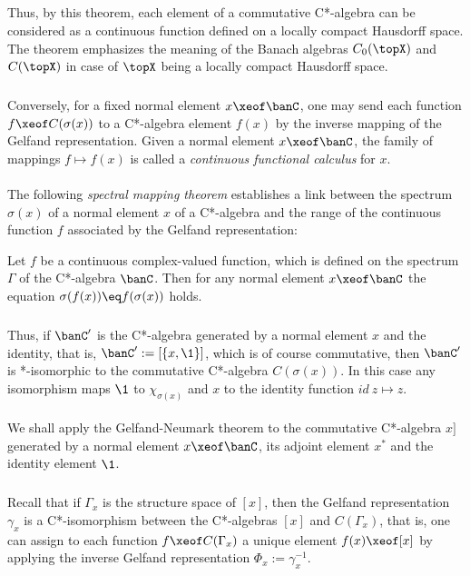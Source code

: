 \documentclass[11pt,twoside]{article}
\begin{document}
\subparagraph{}
Thus, 
by this theorem,
each element of a commutative C*-algebra can be considered
as a continuous function defined on a locally compact Hausdorff space.
The theorem emphasizes the meaning of the Banach algebras $C_0(\topX)$
and $C(\topX)$ in case of $\topX$ being a locally compact Hausdorff space.

\subparagraph{}
Conversely,
for a fixed normal element $x \xeof \banC$,
one may send each function $f \xeof C(\sigma(x))$ to a C*-algebra element $f(x)$
by the inverse mapping of the Gelfand representation.
Given a normal element $x \xeof \banC$,
the family of mappings $f \mapsto f(x)$
is called a \textit{continuous functional calculus} for $x$.

\paragraph{} %
The following \textit{spectral mapping theorem} establishes a link
between the spectrum $\sigma(x)$ of a normal element $x$ of a C*-algebra
and the range of the continuous function $f$
associated by the Gelfand representation:

\begin{theorem1}
Let $f$ be a continuous complex-valued function,
which is defined on the spectrum $\Gamma$ of the C*-algebra $\banC$.
Then for any normal element $x \xeof \banC$
the equation $\sigma(f(x)) \eq f(\sigma(x))$ holds.
\end{theorem1}

\subparagraph{}
Thus,
if $\banC'$ is the C*-algebra generated
by a normal element $x$ and the identity,
that is, $\banC' := [\{x,\1\}]$,
which is of course commutative,
then $\banC'$ is *-isomorphic to the commutative C*-algebra $C(\sigma(x))$.
In this case any isomorphism maps $\1$ to $\chi_{\sigma(x)}$
and $x$ to the identity function $id \: z \mapsto z$.

\paragraph{} %
We shall apply the Gelfand-Neumark theorem to the commutative C*-algebra $x]$
generated by a normal element $x \xeof \banC$,
its adjoint element $x^*$ and the identity element $\1$.

\subparagraph{}
Recall that
if $\Gamma_x$ is the structure space of $[x]$,
then the Gelfand representation $\gamma_x$ is a C*-isomorphism
between the C*-algebras $[x]$ and $C(\Gamma_x)$,
that is,
one can assign to each function $f \xeof C(\Gamma_x)$
a unique element $f(x) \xeof [x]$
by applying the inverse Gelfand representation $\Phi_x := \gamma_x^{-1}$.
\end{document}
